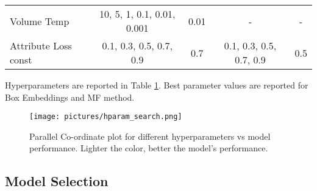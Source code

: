 \begin{table}[H]
{\begin{tabular}{ccccc}
\multicolumn{1}{l}{Volume Temp}          & 10, 5, 1, 0.1, 0.01, 0.001                          & 0.01                                                     & -                                                      & -                                                           \\
\multicolumn{1}{l}{Attribute Loss const} & 0.1, 0.3, 0.5, 0.7, 0.9                             & 0.7                                                      & 0.1, 0.3, 0.5, 0.7, 0.9                                & 0.5                                                         \\ \hline
\end{tabular}
}
\label{tab:hyperparams}
\end{table}
Hyperparameters are reported in Table \ref{tab:hyperparams}. Best parameter values are reported for Box Embeddings and \textsc{MF} method. 
\begin{figure*}[ht]
    \centering
    \texttt{[image: pictures/hparam\_search.png]} %
    \caption{Parallel Co-ordinate plot for different hyperparameters vs model performance. Lighter the color, better the model's performance.}
    \label{fig:generalization-spectrum}
\end{figure*}

\subsection{Model Selection}
\begin{table}[t]
    \centering
    \caption{Test NDCG on $D_{U}^\eval$ for selected models.}
    \label{tab:model_selection}
\end{table}


